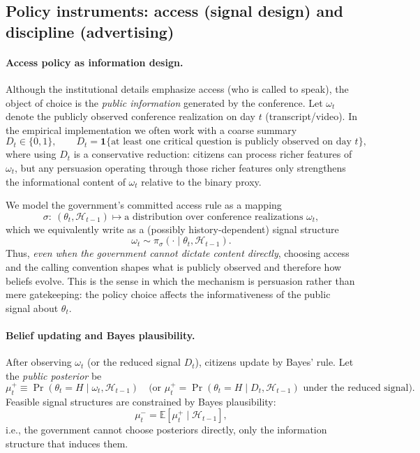 \documentclass[12pt]{article}
\begin{document}
\subsection{Policy instruments: access (signal design) and discipline (advertising)}

\paragraph{Access policy as information design.}
Although the institutional details emphasize access (who is called to speak), the object of choice is the \emph{public information} generated by the conference. Let $\omega_t$ denote the publicly observed conference realization on day $t$ (transcript/video). In the empirical implementation we often work with a coarse summary
\begin{equation}\label{eq:D}
D_t \in \{0,1\},
\qquad
D_t = \mathbf{1}\{\text{at least one critical question is publicly observed on day } t\},
\end{equation}
where using $D_t$ is a conservative reduction: citizens can process richer features of $\omega_t$, but any persuasion operating through those richer features only strengthens the informational content of $\omega_t$ relative to the binary proxy.

We model the government's committed access rule as a mapping
\[
\sigma:\ (\theta_t,\mathcal{H}_{t-1}) \mapsto \text{a distribution over conference realizations } \omega_t,
\]
which we equivalently write as a (possibly history-dependent) signal structure
\[
\omega_t \sim \pi_\sigma(\cdot \mid \theta_t,\mathcal{H}_{t-1}).
\]
Thus, \emph{even when the government cannot dictate content directly}, choosing access and the calling convention shapes what is publicly observed and therefore how beliefs evolve. This is the sense in which the mechanism is persuasion rather than mere gatekeeping: the policy choice affects the informativeness of the public signal about $\theta_t$.

\paragraph{Belief updating and Bayes plausibility.}
After observing $\omega_t$ (or the reduced signal $D_t$), citizens update by Bayes' rule. Let the \emph{public posterior} be
\[
\mu_t^{+}\equiv \Pr(\theta_t=H\mid \omega_t,\mathcal{H}_{t-1})
\quad\text{(or }\mu_t^+=\Pr(\theta_t=H\mid D_t,\mathcal{H}_{t-1})\text{ under the reduced signal).}
\]
Feasible signal structures are constrained by Bayes plausibility:
\[
\mu_t^{-}=\mathbb{E}\!\left[\mu_t^{+}\mid \mathcal{H}_{t-1}\right],
\]
i.e., the government cannot choose posteriors directly, only the information structure that induces them.
\end{document}
